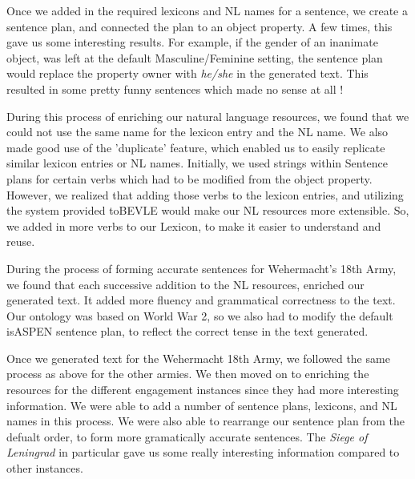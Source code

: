 \documentclass[12pt, letterpaper]{article}
\begin{document}
    \vspace{4mm}

    \noindent
    Once we added in the required lexicons and NL names for a sentence, we create a sentence plan, and connected the plan
    to an object property. A few times, this gave us some interesting results. 
    For example, if the gender of an inanimate object, was left at the default Masculine/Feminine setting,
    the sentence plan would replace the property owner with \textit{he/she} in the generated text. 
    This resulted in some pretty funny sentences which made no sense at all !

    \vspace{4mm}

    \noindent
    During this process of enriching our natural language resources, we found that we could not use the same name for
    the lexicon entry and the NL name. 
    We also made good use of the 'duplicate' feature, which enabled us to easily replicate similar lexicon entries or
    NL names.
    Initially, we used strings within Sentence plans for certain verbs which had to be modified from the object property.
    However, we realized that adding those verbs to the lexicon entries, and utilizing the system provided toBEVLE
    would make our NL resources more extensible.
    So, we added in more verbs to our Lexicon, to make it easier to understand and reuse.

    \vspace{4mm}

    \noindent
    During the process of forming accurate sentences for Wehermacht's 18th Army, we found that each successive addition
    to the NL resources, enriched our generated text.
    It added more fluency and grammatical correctness to the text.
    Our ontology was based on World War 2, so we also had to modify the default isASPEN sentence plan, to reflect the
    correct tense in the text generated.

    \vspace{4mm}

    \noindent
    Once we generated text for the Wehermacht 18th Army, we followed the same process as above for the other armies.
    We then moved on to enriching the resources for the different engagement instances since they had more interesting
    information.
    We were able to add a number of sentence plans, lexicons, and NL names in this process.
    We were also able to rearrange our sentence plan from the defualt order, to form more gramatically accurate sentences.
    The \textit{Siege of Leningrad} in particular gave us some really interesting information compared to other instances.
\end{document}
